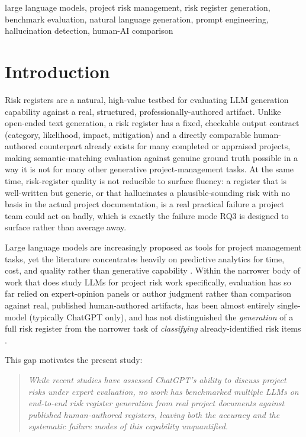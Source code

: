 \documentclass[conference]{IEEEtran}
\begin{document}
\begin{IEEEkeywords}
large language models, project risk management, risk register generation,
benchmark evaluation, natural language generation, prompt engineering,
hallucination detection, human-AI comparison
\end{IEEEkeywords}

\section{Introduction}

Risk registers are a natural, high-value testbed for evaluating LLM
generation capability against a real, structured, professionally-authored
artifact. Unlike open-ended text generation, a risk register has a fixed,
checkable output contract (category, likelihood, impact, mitigation) and a
directly comparable human-authored counterpart already exists for many
completed or appraised projects, making semantic-matching evaluation
against genuine ground truth possible in a way it is not for many other
generative project-management tasks. At the same time, risk-register
quality is not reducible to surface fluency: a register that is
well-written but generic, or that hallucinates a plausible-sounding risk
with no basis in the actual project documentation, is a real practical
failure a project team could act on badly, which is exactly the failure
mode RQ3 is designed to surface rather than average away.

Large language models are increasingly proposed as tools for project
management tasks, yet the literature concentrates heavily on predictive
analytics for time, cost, and quality rather than generative capability
\cite{aidriven2026usecases}. Within the narrower body of work that does
study LLMs for project risk work specifically, evaluation has so far relied
on expert-opinion panels or author judgment rather than comparison against
real, published human-authored artifacts, has been almost entirely
single-model (typically ChatGPT only), and has not distinguished the
\emph{generation} of a full risk register from the narrower task of
\emph{classifying} already-identified risk items
\cite{asce2025exploring_chatgpt_risk,buildings2025risk_classification}.

This gap motivates the present study:
\begin{quote}
\emph{While recent studies have assessed ChatGPT's ability to discuss
project risks under expert evaluation, no work has benchmarked multiple
LLMs on end-to-end risk register generation from real project documents
against published human-authored registers, leaving both the accuracy and
the systematic failure modes of this capability unquantified.}
\end{quote}
\end{document}
